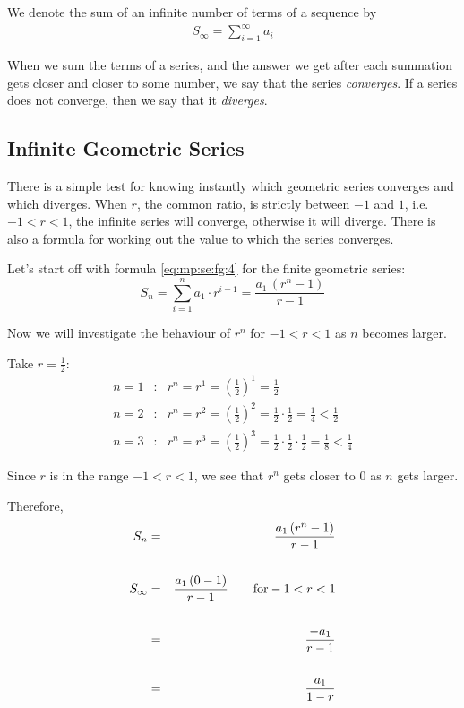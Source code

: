 We denote the sum of an infinite number of terms of a sequence by
\begin{eqnarray*}
S_\infty = \sum^\infty_{i=1} a_i
\end{eqnarray*}

When we sum the terms of a series, and the answer we get after each summation gets closer and closer to some number, we say that the series \textit{converges}. If a series does not converge, then we say that it \textit{diverges}.

\subsection{Infinite Geometric Series}

There is a simple test for knowing instantly which geometric series converges and which diverges. When $r$, the common ratio, is strictly between $-1$ and $1$, i.e. $-1 < r < 1$, the infinite series will converge, otherwise it will diverge. There is also a formula for working out the value to which the series converges.

Let's start off with formula \eqref{eq:mp:se:fg:4} for the finite geometric series:
\begin{equation*}
S_n = \sum_{i=1}^n a_1 \cdot r^{i-1} = \frac{a_1 \, (r^n - 1)}{r-1}
\end{equation*}

Now we will investigate the behaviour of $r^n$ for $-1<r<1$ as $n$ becomes larger.

Take $r=\frac{1}{2}$:
\begin{eqnarray*}
n=1 &:& r^n = r^1 =(\tfrac{1}{2})^1 = \tfrac{1}{2} \\
n=2 &:& r^n = r^2 =(\tfrac{1}{2})^2 = \tfrac{1}{2} \cdot \tfrac{1}{2} = \tfrac{1}{4} < \tfrac{1}{2} \\
n=3 &:& r^n = r^3 =(\tfrac{1}{2})^3 = \tfrac{1}{2} \cdot \tfrac{1}{2} \cdot \tfrac{1}{2} = \tfrac{1}{8} < \tfrac{1}{4}
\end{eqnarray*}

Since $r$ is in the range $-1<r<1$, we see that $r^n$ gets closer to $0$ as $n$ gets larger.

Therefore,
\begin{eqnarray*}
S_n &=& \frac{a_1 \, (r^n - 1)}{r - 1} \\
\vspace{12pt} \\
S_\infty &=& \frac{a_1 \, (0 - 1)}{r - 1} \qquad \mathrm{ for } -1 < r < 1 \\
\vspace{12pt} \\
&=& \frac {-a_1}{r - 1} \\
\vspace{12pt} \\
&=& \frac {a_1}{1 - r}
\end{eqnarray*}

